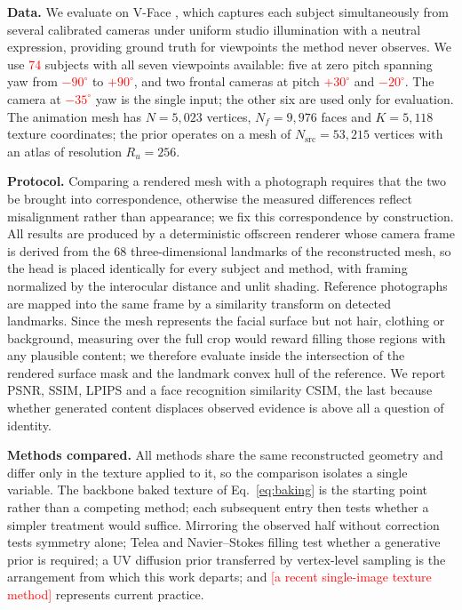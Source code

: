 \documentclass[runningheads]{llncs}
\newcommand{\PH}[1]{\textcolor{red}{#1}}
\begin{document}
\textbf{Data.} We evaluate on V-Face \cite{duong2022vface}, which captures each
subject simultaneously from several calibrated cameras under uniform studio
illumination with a neutral expression, providing ground truth for viewpoints
the method never observes. We use \PH{74} subjects with all seven viewpoints
available: five at zero pitch spanning yaw from \PH{$-90^{\circ}$} to
\PH{$+90^{\circ}$}, and two frontal cameras at pitch \PH{$+30^{\circ}$} and
\PH{$-20^{\circ}$}. The camera at \PH{$-35^{\circ}$} yaw is the single input;
the other six are used only for evaluation. The animation mesh has $N = 5{,}023$ vertices, $N_f = 9{,}976$
faces and $K = 5{,}118$ texture coordinates; the prior operates on a mesh of
$N_{\text{src}} = 53{,}215$ vertices with an atlas of resolution $R_u = 256$.

\textbf{Protocol.} Comparing a rendered mesh with a photograph requires that
the two be brought into correspondence, otherwise the measured differences
reflect misalignment rather than appearance; we fix this correspondence by
construction. All results are produced by a deterministic offscreen renderer
whose camera frame is derived from the 68 three-dimensional landmarks of the
reconstructed mesh, so the head is placed identically for every subject and
method, with framing normalized by the interocular distance and unlit shading.
Reference photographs are mapped into the same frame by a similarity transform
on detected landmarks. Since the mesh represents the facial surface but not
hair, clothing or background, measuring over the full crop would reward filling
those regions with any plausible content; we therefore evaluate inside the
intersection of the rendered surface mask and the landmark convex hull of the
reference. We report PSNR, SSIM, LPIPS \cite{zhang2018lpips} and a face
recognition similarity CSIM, the last because whether generated content
displaces observed evidence is above all a question of identity.

\textbf{Methods compared.} All methods share the same reconstructed geometry
and differ only in the texture applied to it, so the comparison isolates a
single variable. The backbone baked texture of Eq.~\eqref{eq:baking}
\cite{feng2021deca} is the starting point rather than a competing method; each
subsequent entry then tests whether a simpler treatment would suffice.
Mirroring the observed half without correction tests symmetry alone; Telea and
Navier--Stokes filling test whether a generative prior is required; a UV
diffusion prior \cite{li2024uvidm} transferred by vertex-level sampling is the
arrangement from which this work departs; and \PH{[a recent single-image
texture method]} represents current practice.
\end{document}
